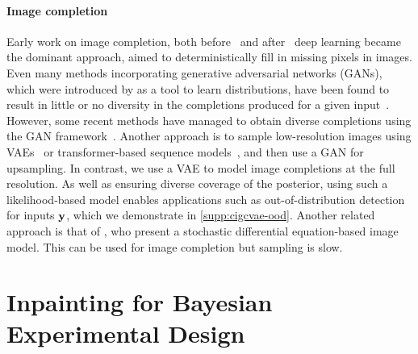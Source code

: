 \paragraph{Image completion}
Early work on image completion, both
before~\citep{bertalmio2000image,bertalmio2001navier,ballester2001filling,levin2003learning,criminisi2003object}
and after~\citep{kohler2014mask,ren2015shepard} deep learning became the
dominant approach, aimed to deterministically fill in missing pixels in images.
Even many methods incorporating generative adversarial networks (GANs), which
were introduced by \citet{goodfellow2014generative} as a tool to learn
distributions, have been found to result in little or no diversity in the
completions produced for a given
input~\citep{song2018spg,yu2018generative,yu2019free,pathak2016context,iizuka2017globally}.
%
However, some recent methods have managed to obtain diverse completions using
the GAN framework~\citep{zhao2020uctgan,zhao2021large,liu2021pd}.
%
Another approach is to sample low-resolution images using
VAEs~\citep{zheng2019pluralistic,peng2021generating} or transformer-based
sequence models~\citep{zheng2021tfill,wan2021high}, and then use a GAN for
upsampling. In contrast, we use a VAE to model image completions at the full
resolution. As well as ensuring diverse coverage of the posterior, using such a
likelihood-based model enables applications such as out-of-distribution
detection for inputs ${\mathbf{y}}$, which we demonstrate in \cref{supp:cigcvae-ood}.
Another related approach is that of \citet{song2020score}, who present a
stochastic differential equation-based image model. This can be used for image
completion but sampling is slow.



\section{Inpainting for Bayesian Experimental Design} \label{sec:cigcvae-boed}

